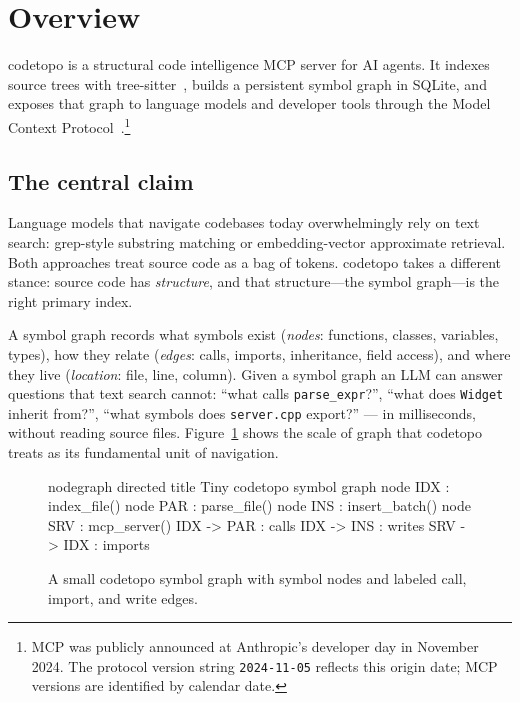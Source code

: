 \section{Overview}
\label{sec:overview}

codetopo is a structural code intelligence MCP server for AI agents. It indexes
source trees with tree-sitter~\cite{brunsfeld2018treesitter}, builds a persistent
symbol graph in SQLite, and exposes that graph to language models and developer
tools through the Model Context Protocol~\cite{anthropic2024mcp}.\footnote{MCP was publicly announced at Anthropic's developer day in November 2024. The protocol version string \texttt{2024-11-05} reflects this origin date; MCP versions are identified by calendar date.}

\subsection{The central claim}

Language models that navigate codebases today overwhelmingly rely on text
search: grep-style substring matching or embedding-vector approximate retrieval.
Both approaches treat source code as a bag of tokens. codetopo takes a
different stance: source code has \emph{structure}, and that structure---the
symbol graph---is the right primary index.

A symbol graph records what symbols exist (\emph{nodes}: functions, classes,
variables, types), how they relate (\emph{edges}: calls, imports, inheritance,
field access), and where they live (\emph{location}: file, line, column). Given
a symbol graph an LLM can answer questions that text search cannot:
``what calls \texttt{parse\_expr}?'', ``what does \texttt{Widget} inherit from?'',
``what symbols does \texttt{server.cpp} export?'' --- in milliseconds, without
reading source files. Figure~\ref{fig:symbol-graph} shows the scale of graph
that codetopo treats as its fundamental unit of navigation.

\begin{figure}[htbp]
  \centering
\begin{triton}
nodegraph
  directed
  title Tiny codetopo symbol graph
  node IDX : index_file()
  node PAR : parse_file()
  node INS : insert_batch()
  node SRV : mcp_server()
  IDX -> PAR : calls
  IDX -> INS : writes
  SRV -> IDX : imports
\end{triton}
  \caption{A small codetopo symbol graph with symbol nodes and labeled call,
           import, and write edges.}
  \label{fig:symbol-graph}
\end{figure}

